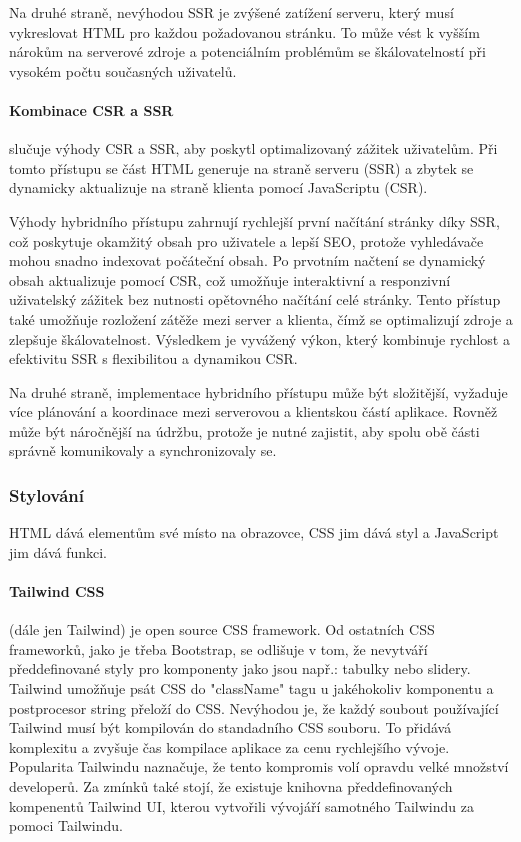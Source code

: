 \documentclass[12pt, a4paper]{article}
\begin{document}
Na druhé straně, nevýhodou SSR je zvýšené zatížení serveru, který musí vykreslovat HTML pro každou požadovanou stránku. To může vést k vyšším nárokům na serverové zdroje a potenciálním problémům se škálovatelností při vysokém počtu současných uživatelů.
\paragraph{Kombinace CSR a SSR}
slučuje výhody CSR a SSR, aby poskytl optimalizovaný zážitek uživatelům. Při tomto přístupu se část HTML generuje na straně serveru (SSR) a zbytek se dynamicky aktualizuje na straně klienta pomocí JavaScriptu (CSR).

Výhody hybridního přístupu zahrnují rychlejší první načítání stránky díky SSR, což poskytuje okamžitý obsah pro uživatele a lepší SEO, protože vyhledávače mohou snadno indexovat počáteční obsah. Po prvotním načtení se dynamický obsah aktualizuje pomocí CSR, což umožňuje interaktivní a responzivní uživatelský zážitek bez nutnosti opětovného načítání celé stránky. Tento přístup také umožňuje rozložení zátěže mezi server a klienta, čímž se optimalizují zdroje a zlepšuje škálovatelnost. Výsledkem je vyvážený výkon, který kombinuje rychlost a efektivitu SSR s flexibilitou a dynamikou CSR.

Na druhé straně, implementace hybridního přístupu může být složitější, vyžaduje více plánování a koordinace mezi serverovou a klientskou částí aplikace. Rovněž může být náročnější na údržbu, protože je nutné zajistit, aby spolu obě části správně komunikovaly a synchronizovaly se.

\subsubsection{Stylování}
HTML dává elementům své místo na obrazovce, CSS jim dává styl a JavaScript jim dává funkci.
\paragraph{Tailwind CSS}
(dále jen Tailwind) je open source CSS framework. Od ostatních CSS frameworků, jako je třeba Bootstrap, se odlišuje v tom, že nevytváří předdefinované styly pro komponenty jako jsou např.: tabulky nebo slidery. Tailwind umožňuje psát CSS do "className" tagu u jakéhokoliv komponentu a postprocesor string přeloží do CSS. Nevýhodou je, že každý soubout používající Tailwind musí být kompilován do standadního CSS souboru. To přidává komplexitu a zvyšuje čas kompilace aplikace za cenu rychlejšího vývoje. Popularita Tailwindu naznačuje, že tento kompromis volí opravdu velké množství developerů. Za zmínků také stojí, že existuje knihovna předdefinovaných kompenentů Tailwind UI, kterou vytvořili vývojáří samotného Tailwindu za pomoci Tailwindu.
\cite{tailwind_labs_tailwind_2020}
\end{document}
